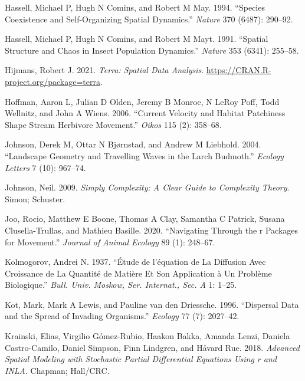 \begin{CSLReferences}{1}{0}
\leavevmode{}%
Hassell, Michael P, Hugh N Comins, and Robert M May. 1994. {``Species Coexistence and Self-Organizing Spatial Dynamics.''} \emph{Nature} 370 (6487): 290--92.

\leavevmode{}%
Hassell, Michael P, Hugh N Comins, and Robert M Mayt. 1991. {``Spatial Structure and Chaos in Insect Population Dynamics.''} \emph{Nature} 353 (6341): 255--58.

\leavevmode{}%
Hijmans, Robert J. 2021. \emph{Terra: Spatial Data Analysis}. \url{https://CRAN.R-project.org/package=terra}.

\leavevmode{}%
Hoffman, Aaron L, Julian D Olden, Jeremy B Monroe, N LeRoy Poff, Todd Wellnitz, and John A Wiens. 2006. {``Current Velocity and Habitat Patchiness Shape Stream Herbivore Movement.''} \emph{Oikos} 115 (2): 358--68.

\leavevmode{}%
Johnson, Derek M, Ottar N Bjørnstad, and Andrew M Liebhold. 2004. {``Landscape Geometry and Travelling Waves in the Larch Budmoth.''} \emph{Ecology Letters} 7 (10): 967--74.

\leavevmode{}%
Johnson, Neil. 2009. \emph{Simply Complexity: A Clear Guide to Complexity Theory}. Simon; Schuster.

\leavevmode{}%
Joo, Rocio, Matthew E Boone, Thomas A Clay, Samantha C Patrick, Susana Clusella-Trullas, and Mathieu Basille. 2020. {``Navigating Through the r Packages for Movement.''} \emph{Journal of Animal Ecology} 89 (1): 248--67.

\leavevmode{}%
Kolmogorov, Andrei N. 1937. {``{É}tude de l'{é}quation de La Diffusion Avec Croissance de La Quantit{é} de Mati{è}re Et Son Application {à} Un Probl{è}me Biologique.''} \emph{Bull. Univ. Moskow, Ser. Internat., Sec. A} 1: 1--25.

\leavevmode{}%
Kot, Mark, Mark A Lewis, and Pauline van den Driessche. 1996. {``Dispersal Data and the Spread of Invading Organisms.''} \emph{Ecology} 77 (7): 2027--42.

\leavevmode{}%
Krainski, Elias, Virgilio Gómez-Rubio, Haakon Bakka, Amanda Lenzi, Daniela Castro-Camilo, Daniel Simpson, Finn Lindgren, and Håvard Rue. 2018. \emph{Advanced Spatial Modeling with Stochastic Partial Differential Equations Using r and INLA}. Chapman; Hall/CRC.


\end{CSLReferences}
